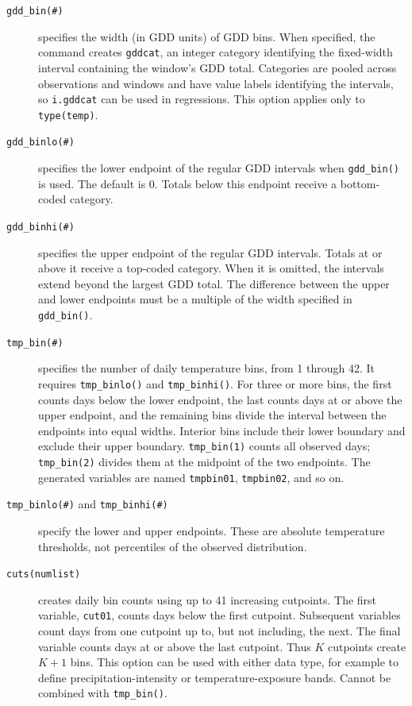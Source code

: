 \begin{description}
	\item[\texttt{gdd\_bin(\#)}] specifies the width (in GDD units) of GDD bins. When specified, the command creates \texttt{gddcat}, an integer category identifying the fixed-width interval containing the window's GDD total. Categories are pooled across observations and windows and have value labels identifying the intervals, so \texttt{i.gddcat} can be used in regressions. This option applies only to \texttt{type(temp)}.
	\item[\texttt{gdd\_binlo(\#)}] specifies the lower endpoint of the regular GDD intervals when \texttt{gdd\_bin()} is used. The default is 0. Totals below this endpoint receive a bottom-coded category.
	\item[\texttt{gdd\_binhi(\#)}] specifies the upper endpoint of the regular GDD intervals. Totals at or above it receive a top-coded category. When it is omitted, the intervals extend beyond the largest GDD total. The difference between the upper and lower endpoints must be a multiple of the width specified in \texttt{gdd\_bin()}.
	\item[\texttt{tmp\_bin(\#)}] specifies the number of daily temperature bins, from 1 through 42. It requires \texttt{tmp\_binlo()} and \texttt{tmp\_binhi()}. For three or more bins, the first counts days below the lower endpoint, the last counts days at or above the upper endpoint, and the remaining bins divide the interval between the endpoints into equal widths. Interior bins include their lower boundary and exclude their upper boundary. \texttt{tmp\_bin(1)} counts all observed days; \texttt{tmp\_bin(2)} divides them at the midpoint of the two endpoints. The generated variables are named \texttt{tmpbin01}, \texttt{tmpbin02}, and so on.
	\item[\texttt{tmp\_binlo(\#)} and \texttt{tmp\_binhi(\#)}] specify the lower and upper endpoints. These are absolute temperature thresholds, not percentiles of the observed distribution.
	\item[\texttt{cuts(numlist)}] creates daily bin counts using up to 41 increasing cutpoints. The first variable, \texttt{cut01}, counts days below the first cutpoint. Subsequent variables count days from one cutpoint up to, but not including, the next. The final variable counts days at or above the last cutpoint. Thus $K$ cutpoints create $K + 1$ bins. This option can be used with either data type, for example to define precipitation-intensity or temperature-exposure bands. Cannot be combined with \texttt{tmp\_bin()}.
\end{description}

